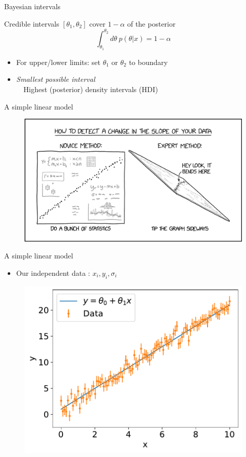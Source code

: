 \documentclass[
aspectratio=169,
14pt,
professionalfonts
]{beamer}
\newcommand{\arrow}{~\ding{220}~}
\begin{document}
\begin{frame}{Bayesian intervals}

Credible intervals $[\theta_1, \theta_2]$ cover $1-\alpha$ of the posterior
$$
\int_{\theta_1}^{\theta_2} d\theta ~ p(\theta| x) = 1-\alpha
$$
\begin{itemize}
    \item For upper/lower limits: set $\theta_1$ or $\theta_2$ to boundary
    \item \textit{Smallest possible interval}\\
        \arrow Highest (posterior) density intervals (HDI)
\end{itemize}
\end{frame}

\begin{frame}{A simple linear model}
    \begin{figure}
        \centering
        \includegraphics[width=0.8\linewidth]{../plots/change_in_slope_2x.png}
    \end{figure}
\end{frame}

\begin{frame}{A simple linear model}

    \begin{itemize}
        \item Our independent data : $x_i, y_i, \sigma_i$
    \end{itemize}

    \begin{figure}
        \centering
        \includegraphics[width=0.5\linewidth]{../plots/linear_data.pdf}
    \end{figure}

\end{frame}
\end{document}
